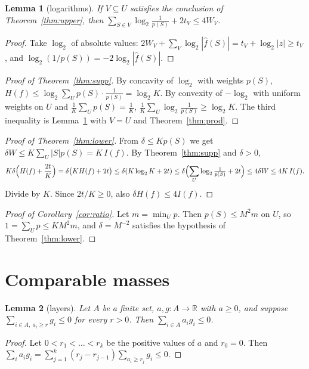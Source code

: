 \documentclass[11pt]{article}
\newtheorem{lemma}{Lemma}
\theoremstyle{definition}
\theoremstyle{remark}
\newcommand{\R}{\mathbb R}
\renewcommand{\lg}{\log_2}
\begin{document}
\begin{lemma}[logarithms]\label{lem:log}
If $V\subseteq U$ satisfies the conclusion of Theorem~\ref{thm:upper}, then
$\sum_{S\in V}\lg\frac1{p(S)}+2t_V\le4W_V$.
\end{lemma}

\begin{proof}
Take $\lg$ of absolute values: $2W_V+\sum_V\lg|\hat f(S)|=t_V+\lg|z|\ge t_V$,
and $\lg(1/p(S))=-2\lg|\hat f(S)|$.
\end{proof}

\begin{proof}[Proof of Theorem~\ref{thm:supp}]
By concavity of $\lg$ with weights $p(S)$,
$H(f)\le\lg\sum_Up(S)\cdot\frac1{p(S)}=\lg K$. By convexity of $-\lg$ with
uniform weights on $U$ and $\frac1K\sum_Up(S)=\frac1K$,
$\frac1K\sum_U\lg\frac1{p(S)}\ge\lg K$. The third inequality is
Lemma~\ref{lem:log} with $V=U$ and Theorem~\ref{thm:prod}.
\end{proof}

\begin{proof}[Proof of Theorem~\ref{thm:lower}]
From $\delta\le Kp(S)$ we get $\delta W\le K\sum_U|S|p(S)=K\,I(f)$. By
Theorem~\ref{thm:supp} and $\delta>0$,
\[
K\delta\Bigl(H(f)+\frac{2t}K\Bigr)=\delta\bigl(KH(f)+2t\bigr)\le\delta(K\lg K+2t)
\le\delta\Bigl(\sum_U\lg\tfrac1{p(S)}+2t\Bigr)\le4\delta W\le4K\,I(f).
\]
Divide by $K$. Since $2t/K\ge0$, also $\delta H(f)\le4I(f)$.
\end{proof}

\begin{proof}[Proof of Corollary~\ref{cor:ratio}]
Let $m=\min_Up$. Then $p(S)\le M^2m$ on $U$, so $1=\sum_Up\le KM^2m$, and
$\delta=M^{-2}$ satisfies the hypothesis of Theorem~\ref{thm:lower}.
\end{proof}

\section{Comparable masses}\label{sec:comp}

\begin{lemma}[layers]\label{lem:layer}
Let $A$ be a finite set, $a,g:A\to\R$ with $a\ge0$, and suppose
$\sum_{i\in A,\ a_i\ge r}g_i\le0$ for every $r>0$. Then $\sum_{i\in A}a_ig_i\le0$.
\end{lemma}

\begin{proof}
Let $0<r_1<\dots<r_k$ be the positive values of $a$ and $r_0=0$. Then
$\sum_ia_ig_i=\sum_{j=1}^k(r_j-r_{j-1})\sum_{a_i\ge r_j}g_i\le0$.
\end{proof}
\end{document}
